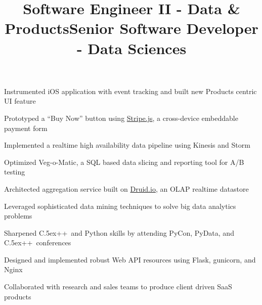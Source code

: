 \documentclass[12pt, tweaklist, line]{res}
\let\tempone\itemize
\let\temptwo\enditemize
\renewenvironment{itemize}{\tempone\vspace{-.15in}\setlength{\topsep}{0pt}\setlength{\itemsep}{3pt}\vspace{-.15in}}{\temptwo}
\def\Cplusplus{{\rm C\raise.5ex\hbox{\small ++}}}
\begin{document}
\begin{resume}
\title{Software Engineer II - Data \& Products}
\begin{position}
\begin{itemize}
\item Instrumented iOS application with event tracking and built new Products centric UI feature
\item Prototyped a ``Buy Now'' button using \href{https://stripe.com/}{Stripe.js}, a cross-device embeddable payment form
\item Implemented a realtime high availability data pipeline using Kinesis and Storm
\item Optimized Veg-o-Matic, a SQL based data slicing and reporting tool for A/B testing
\item Architected aggregation service built on \href{http://druid.io/}{Druid.io}, an OLAP realtime datastore
\end{itemize}
\end{position}

\title{Senior Software Developer - Data Sciences}
\begin{position}
\begin{itemize}
\item Leveraged sophisticated data mining techniques to solve big data analytics problems
\item Sharpened \Cplusplus~and Python skills by attending PyCon, PyData, and \Cplusplus~conferences
\item Designed and implemented robust Web API resources using Flask, gunicorn, and Nginx
\item Collaborated with research and sales teams to produce client driven SaaS products
\end{itemize}
\end{position}


\end{resume}
\end{document}
